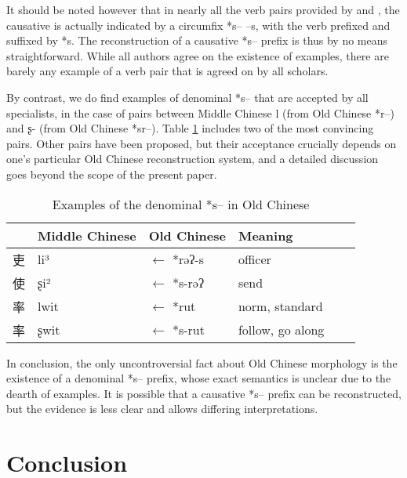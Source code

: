 \documentclass[oldfontcommands,oneside,a4paper,11pt]{article}
\newcommand{\ipa}[1]{{\phon \mbox{#1}}} %
\newcommand{\zh}[1]{{\cn #1}}
\begin{document}
It should be noted however that in nearly all the verb pairs provided by \citealt{sagart99roc} and \citet{sagart12sprefix}, the causative is actually indicated by a circumfix *s-- --s, with the verb prefixed and suffixed by *s. The reconstruction of a causative *\ipa{s--} prefix is thus by no means straightforward. While all authors agree on the existence of examples, there are barely any example of a verb pair that is agreed on by all scholars.

 By contrast, we do find examples of denominal *\ipa{s--} that are accepted by all specialists, in the case of pairs between Middle Chinese \ipa{l} (from Old Chinese *\ipa{r--}) and \ipa{ʂ-} (from Old Chinese *\ipa{sr--}). Table \ref{tab:denom.oc} includes two of the most convincing pairs. Other pairs have been proposed, but their acceptance crucially depends on one's particular Old Chinese reconstruction system, and a detailed discussion goes beyond the scope of the present paper.  
  
  \begin{table}[h]
\caption{Examples of the denominal *\ipa{s--} in Old Chinese}\label{tab:denom.oc} \centering
\begin{tabular}{llllll}
\toprule 
  &Middle Chinese  &Old Chinese &Meaning \\
  \midrule
\zh{吏}& \ipa{li³} &$\leftarrow$ *\ipa{rəʔ-s}  & officer \\
\zh{使}& \ipa{ʂi²} &$\leftarrow$ *\ipa{s-rəʔ} &send  \\
\zh{率}& \ipa{lwit} &$\leftarrow$ *\ipa{rut} & norm, standard \\
\zh{率} &\ipa{ʂwit} &$\leftarrow$ *\ipa{s-rut} & follow, go along  \\
\bottomrule
\end{tabular}
\end{table}
 

 In conclusion, the only uncontroversial fact about Old Chinese morphology is the existence of a denominal *\ipa{s--} prefix, whose exact semantics is unclear due to the dearth of examples. It is possible that a causative *\ipa{s--} prefix can be reconstructed, but the evidence is less clear and allows differing interpretations.
  


\section{Conclusion}
\end{document}
